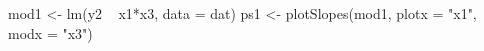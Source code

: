 \begin{Schunk}
\begin{Sinput}
 mod1 <- lm(y2 ~ x1*x3, data = dat)
 ps1 <- plotSlopes(mod1, plotx = "x1", modx = "x3")
\end{Sinput}
\end{Schunk}
